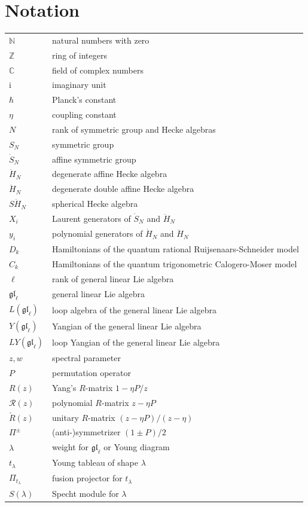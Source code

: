 \documentclass[11pt]{report}
\theoremstyle{definition}
\theoremstyle{remark}
\theoremstyle{remark}
\newcommand{\N}{\mathbb{N}}
\newcommand{\Z}{\mathbb{Z}}
\newcommand{\C}{\mathbb{C}}
\newcommand{\I}{\mathrm{i}}
\begin{document}

\chapter*{Notation}\label{chapter:notation}

\begin{tabular}{l|l}
$\N$ & natural numbers with zero \\
$\Z$ & ring of integers \\
$\C$ & field of complex numbers \\
$\I$ & imaginary unit \\
$\hbar$ & Planck's constant \\
$\eta$ & coupling constant \\
$N$ & rank of symmetric group and Hecke algebras \\
$S_N$ & symmetric group \\
$\dot S_N$ & affine symmetric group \\
$\dot H_N$ & degenerate affine Hecke algebra \\
$\ddot H_N$ & degenerate double affine Hecke algebra \\
$S\ddot H_N$ & spherical Hecke algebra \\
$X_i$ & Laurent generators of $\dot S_N$ and $\ddot H_N$ \\
$y_i$ & polynomial generators of $\dot H_N$ and $\ddot H_N$ \\
$D_k$ & Hamiltonians of the quantum rational Ruijsenaars-Schneider model \\
$C_k$ & Hamiltonians of the quantum trigonometric Calogero-Moser model \\
$\ell$ & rank of general linear Lie algebra \\
$\mathfrak{gl}_\ell$ & general linear Lie algebra \\
$L(\mathfrak{gl}_\ell)$ & loop algebra of the general linear Lie algebra \\
$Y(\mathfrak{gl}_\ell)$ & Yangian of the general linear Lie algebra \\
$LY(\mathfrak{gl}_\ell)$ & loop Yangian of the general linear Lie algebra \\
$z,w$ & spectral parameter \\
$P$ & permutation operator \\
$R(z)$ & Yang's $R$-matrix $1-\eta P/z$ \\
$\mathcal{R}(z)$ & polynomial $R$-matrix $z-\eta P$ \\
$\check R(z)$ & unitary $R$-matrix $(z-\eta P)/(z-\eta)$ \\
$\Pi^\pm$ & (anti-)symmetrizer $(1 \pm P)/2$ \\
$\lambda$ & weight for $\mathfrak{gl}_\ell$ or Young diagram \\
$t_\lambda$ & Young tableau of shape $\lambda$ \\
$\Pi_{t_\lambda}$ & fusion projector for $t_\lambda$ \\
$S(\lambda)$ & Specht module for $\lambda$
\end{tabular}
\end{document}
